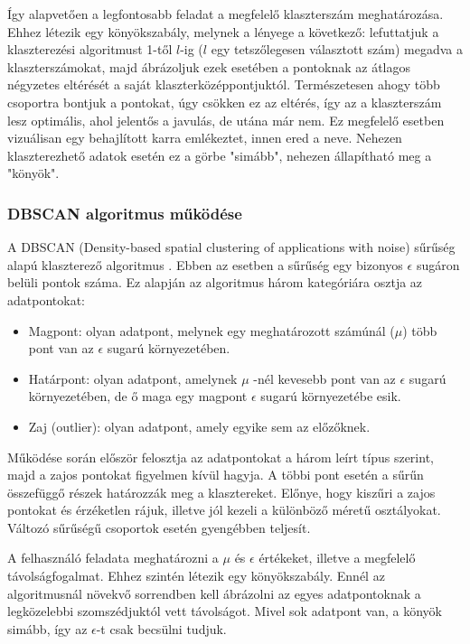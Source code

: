 \documentclass[12pt]{article}
\begin{document}
Így alapvetően a legfontosabb feladat a megfelelő klaszterszám meghatározása. Ehhez létezik egy könyökszabály, melynek a lényege a következő: lefuttatjuk a klaszterezési algoritmust 1-től $l$-ig ($l$ egy tetszőlegesen választott szám) megadva a klaszterszámokat, majd ábrázoljuk ezek esetében a pontoknak az átlagos négyzetes eltérését a saját klaszterközéppontjuktól. Természetesen ahogy több csoportra bontjuk a pontokat, úgy csökken ez az eltérés, így az a klaszterszám lesz optimális, ahol jelentős a javulás, de utána már nem. Ez megfelelő esetben vizuálisan egy behajlított karra emlékeztet, innen ered a neve. Nehezen klaszterezhető adatok esetén ez a görbe "simább", nehezen állapítható meg a "könyök".

\subsubsection{DBSCAN algoritmus működése}

A DBSCAN (Density-based spatial clustering of applications with noise) sűrűség alapú klaszterező algoritmus \cite{bevadat}. Ebben az esetben a sűrűség egy bizonyos $\epsilon$ sugáron belüli pontok száma. Ez alapján az algoritmus három kategóriára osztja az adatpontokat:
\begin{itemize}
\item Magpont: olyan adatpont, melynek egy meghatározott számúnál ($\mu$) több pont van az $\epsilon$ sugarú környezetében.
\item Határpont: olyan adatpont, amelynek $\mu$ -nél kevesebb pont van az $\epsilon$ sugarú környezetében, de ő maga egy magpont $\epsilon$ sugarú környezetébe esik.
\item Zaj (outlier): olyan adatpont, amely egyike sem az előzőknek.
\end{itemize}

Működése során először felosztja az adatpontokat a három leírt típus szerint, majd a zajos pontokat figyelmen kívül hagyja. A többi pont esetén a sűrűn összefüggő részek határozzák meg a klasztereket. Előnye, hogy kiszűri a zajos pontokat és érzéketlen rájuk, illetve jól kezeli a különböző méretű osztályokat. Változó sűrűségű csoportok esetén gyengébben teljesít.

A felhasználó feladata meghatározni a $\mu$ és $\epsilon$ értékeket, illetve a megfelelő távolságfogalmat. Ehhez szintén létezik egy könyökszabály. Ennél az algoritmusnál növekvő sorrendben kell ábrázolni az egyes adatpontoknak a legközelebbi szomszédjuktól vett távolságot. Mivel sok adatpont van, a könyök simább, így az $\epsilon$-t csak becsülni tudjuk. 
\end{document}
